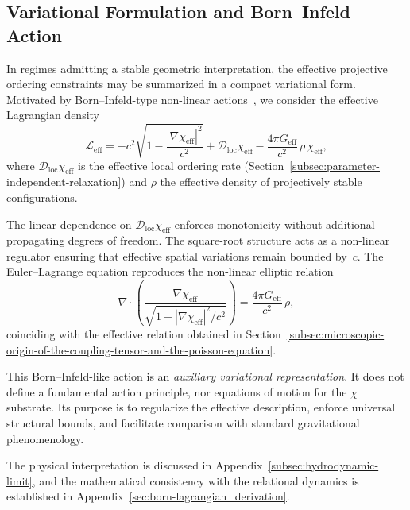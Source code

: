 \subsection{Variational Formulation and Born--Infeld Action}
  \label{subsec:variational-formulation}

  In regimes admitting a stable geometric interpretation, the effective
  projective ordering constraints may be summarized in a compact variational
  form.
  Motivated by Born--Infeld-type non-linear
  actions~\cite{BornInfeld1934,DeserGibbons1998}, we consider the effective
  Lagrangian density
  \begin{equation}
    \mathcal{L}_{\mathrm{eff}}
    = -c^2 \sqrt{1
    - \frac{|\nabla \chi_{\mathrm{eff}}|^2}{c^2}}
    + \mathcal{D}_{\mathrm{loc}}\chi_{\mathrm{eff}}
    - \frac{4\pi G_{\mathrm{eff}}}{c^2}\,\rho\,\chi_{\mathrm{eff}} ,
    \label{eq:leff_equation}
  \end{equation}
  where $\mathcal{D}_{\mathrm{loc}}\chi_{\mathrm{eff}}$ is the effective
  local ordering rate
  (Section~\ref{subsec:parameter-independent-relaxation})
  and $\rho$ the effective density of projectively stable configurations.

  The linear dependence on
  $\mathcal{D}_{\mathrm{loc}}\chi_{\mathrm{eff}}$ enforces monotonicity
  without additional propagating degrees of freedom.
  The square-root structure acts as a non-linear regulator ensuring that
  effective spatial variations remain bounded by~$c$.
  The Euler--Lagrange equation reproduces the non-linear elliptic relation
  \begin{equation}
    \nabla \cdot
    \left(
      \frac{\nabla \chi_{\mathrm{eff}}}
      {\sqrt{1 - |\nabla \chi_{\mathrm{eff}}|^2 / c^2}}
    \right)
    = \frac{4\pi G_{\mathrm{eff}}}{c^2}\,\rho ,
    \label{eq:nonlinear_poisson}
  \end{equation}
  coinciding with the effective relation obtained in
  Section~\ref{subsec:microscopic-origin-of-the-coupling-tensor-and-the-poisson-equation}.

  This Born--Infeld-like action is an \emph{auxiliary variational
representation}.
  It does not define a fundamental action principle, nor equations of motion
  for the $\chi$ substrate.
  Its purpose is to regularize the effective description, enforce universal
  structural bounds, and facilitate comparison with standard gravitational
  phenomenology.

  The physical interpretation is discussed in
  Appendix~\ref{subsec:hydrodynamic-limit}, and the mathematical consistency
  with the relational dynamics is established in
  Appendix~\ref{sec:born-lagrangian_derivation}.

